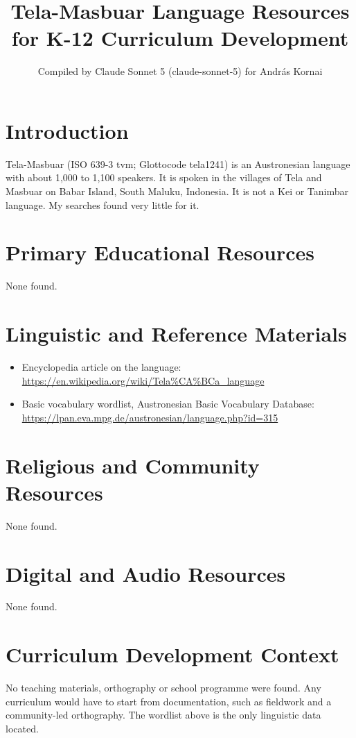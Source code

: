 \documentclass[12pt]{article}
\title{Tela-Masbuar Language Resources for K-12 Curriculum Development}
\author{Compiled by Claude Sonnet 5 (claude-sonnet-5) for Andr\'as Kornai}
\date{}
\begin{document}
\maketitle

\section{Introduction}
Tela-Masbuar (ISO 639-3 tvm; Glottocode tela1241) is an Austronesian language with about 1,000 to 1,100 speakers. It is spoken in the villages of Tela and Masbuar on Babar Island, South Maluku, Indonesia. It is not a Kei or Tanimbar language. My searches found very little for it.

\section{Primary Educational Resources}
None found.

\section{Linguistic and Reference Materials}
\begin{itemize}
\item Encyclopedia article on the language: \url{https://en.wikipedia.org/wiki/Tela%CA%BCa_language}
\item Basic vocabulary wordlist, Austronesian Basic Vocabulary Database: \url{https://lpan.eva.mpg.de/austronesian/language.php?id=315}
\end{itemize}

\section{Religious and Community Resources}
None found.

\section{Digital and Audio Resources}
None found.

\section{Curriculum Development Context}
No teaching materials, orthography or school programme were found. Any curriculum would have to start from documentation, such as fieldwork and a community-led orthography. The wordlist above is the only linguistic data located.
\end{document}
